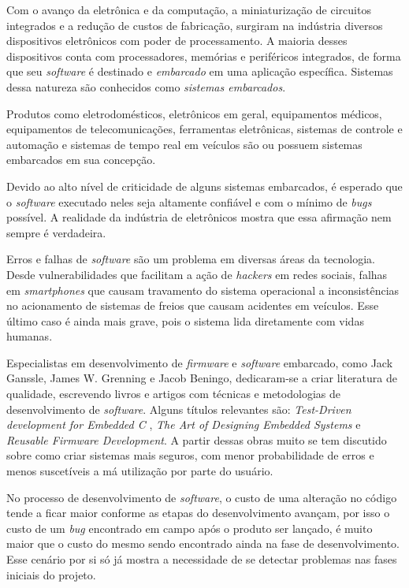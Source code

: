 \documentclass[times, twoside, watermark]{artigo}
\begin{document}
Com o avanço da eletrônica e da computação, a miniaturização de circuitos integrados
e a redução de custos de fabricação, surgiram na indústria diversos dispositivos
eletrônicos com poder de processamento.
A maioria desses dispositivos conta com processadores, memórias e periféricos
integrados, de forma que seu \textit{software} é destinado e \textit{embarcado}
em uma aplicação específica. Sistemas dessa natureza são conhecidos como
\textit{sistemas embarcados}.

Produtos como eletrodomésticos, eletrônicos em geral, equipamentos médicos,
equipamentos de telecomunicações, ferramentas eletrônicas, sistemas de controle
e automação e sistemas de tempo real em veículos são ou possuem sistemas embarcados
em sua concepção.

Devido ao alto nível de criticidade de alguns sistemas embarcados, é esperado que o
\textit{software} executado neles seja altamente confiável e com o mínimo de
\textit{bugs} possível.
A realidade da indústria de eletrônicos mostra que essa afirmação nem sempre é
verdadeira.

Erros e falhas de \textit{software} são um problema em diversas áreas da tecnologia.
Desde vulnerabilidades que facilitam a ação de \textit{hackers} em redes sociais,
falhas em \textit{smartphones} que causam travamento do sistema operacional a
inconsistências no acionamento de sistemas de freios que causam acidentes em
veículos. Esse último caso é ainda mais grave, pois o sistema lida diretamente com
vidas humanas.

Especialistas em desenvolvimento de \textit{firmware} e \textit{software} embarcado,
como Jack Ganssle, James W. Grenning e Jacob Beningo, dedicaram-se a criar
literatura de qualidade, escrevendo livros e artigos com técnicas e
metodologias de desenvolvimento de \textit{software}.
Alguns títulos relevantes são: \textit{Test-Driven development for Embedded C}
\cite{tddembeddedc},
\textit{The Art of Designing Embedded Systems}\cite{ganssle2008art} e
\textit{Reusable Firmware Development}\cite{beningo2017reusable}.
A partir dessas obras muito se tem discutido sobre como criar sistemas mais seguros,
com menor probabilidade de erros e menos suscetíveis a má utilização por parte do
usuário.

No processo de desenvolvimento de \textit{software}, o custo de uma alteração no
código tende a ficar maior conforme  as etapas do desenvolvimento avançam, por isso
o custo de um \textit{bug} encontrado em campo após o produto ser lançado, é muito
maior que o custo do mesmo sendo encontrado ainda na fase de
desenvolvimento\cite{firmwarecost}.
Esse cenário por si só já mostra a necessidade de se detectar problemas nas fases
iniciais do projeto.
\end{document}
